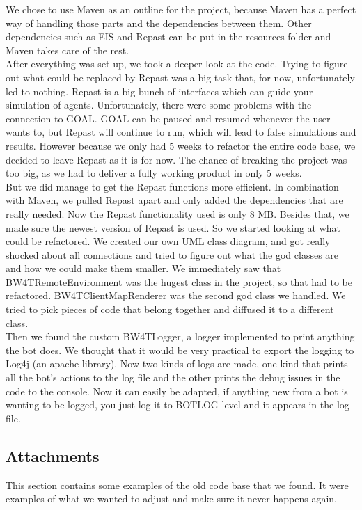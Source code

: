 We chose to use Maven as an outline for the project, because Maven has a perfect way of handling those parts and the dependencies between them. Other dependencies such as EIS and Repast can be put in the resources folder and Maven takes care of the rest. \\
\indent After everything was set up, we took a deeper look at the code. Trying to figure out what could be replaced by Repast was a big task that, for now, unfortunately led to nothing. Repast is a big bunch of interfaces which can guide your simulation of agents. Unfortunately, there were some problems with the connection to GOAL. GOAL can be paused and resumed whenever the user wants to, but Repast will continue to run, which will lead to false simulations and results. However because we only had 5 weeks to refactor the entire code base, we decided to leave Repast as it is for now. The chance of breaking the project was too big, as we had to deliver a fully working product in only 5 weeks. \\
\indent But we did manage to get the Repast functions more efficient. In combination with Maven, we pulled Repast apart and only added the dependencies that are really needed. Now the Repast functionality used is only 8 MB. Besides that, we made sure the newest version of Repast is used.
So we started looking at what could be refactored. We created our own UML class diagram, and got really shocked about all connections and tried to figure out what the god classes are and how we could make them smaller. We immediately saw that BW4TRemoteEnvironment was the hugest class in the project, so that had to be refactored. BW4TClientMapRenderer was the second god class we handled. We tried to pick pieces of code that belong together and diffused it to a different class. \\
\indent Then we found the custom BW4TLogger, a logger implemented to print anything the bot does. We thought that it would be very practical to export the logging to Log4j (an apache library). Now two kinds of logs are made, one kind that prints all the bot's actions to the log file and the other prints the debug issues in the code to the console. Now it can easily be adapted, if anything new from a bot is wanting to be logged, you just log it to BOTLOG level and it appears in the log file.

\subsection{Attachments} 
This section contains some examples of the old code base that we found. It were examples of what we wanted to adjust and make sure it never happens again.

